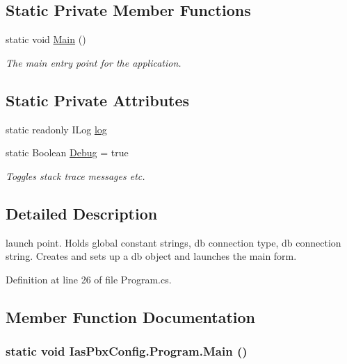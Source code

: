\subsection*{Static Private Member Functions}
\begin{DoxyCompactItemize}
\item 
static void \hyperlink{class_ias_pbx_config_1_1_program_ab161f89011eaa7c002ca750c3f9041c7}{Main} ()
\begin{DoxyCompactList}\small\item\em The main entry point for the application. \item\end{DoxyCompactList}\end{DoxyCompactItemize}
\subsection*{Static Private Attributes}
\begin{DoxyCompactItemize}
\item 
static readonly ILog \hyperlink{class_ias_pbx_config_1_1_program_aa85a518f60538b87328eee5503af726c}{log}
\item 
static Boolean \hyperlink{class_ias_pbx_config_1_1_program_a6271cbd5697b7b8d3d8df052841389ab}{Debug} = true
\begin{DoxyCompactList}\small\item\em Toggles stack trace messages etc. \item\end{DoxyCompactList}\end{DoxyCompactItemize}


\subsection{Detailed Description}
launch point. Holds global constant strings, db connection type, db connection string. Creates and sets up a db object and launches the main form. 

Definition at line 26 of file Program.cs.

\subsection{Member Function Documentation}
\hypertarget{class_ias_pbx_config_1_1_program_ab161f89011eaa7c002ca750c3f9041c7}{
\subsubsection[{Main}]{\setlength{\rightskip}{0pt plus 5cm}static void IasPbxConfig.Program.Main ()}}
\label{class_ias_pbx_config_1_1_program_ab161f89011eaa7c002ca750c3f9041c7}


